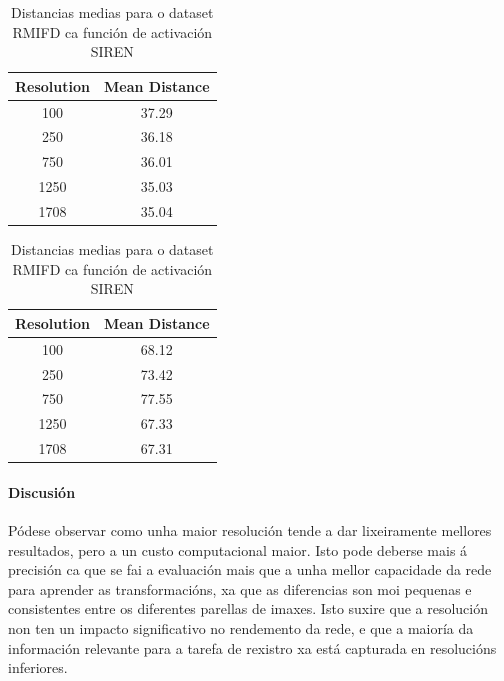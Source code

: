 \begin{table}[h]
    \centering
    \begin{minipage}[t]{0.45\linewidth}
        \centering
        \begin{tabular}{|c|c|}
        \hline
        Resolution & Mean Distance \\ \hline
        100 & 37.29 \\ \hline
        250 & 36.18 \\ \hline
        750 & 36.01 \\ \hline
        1250 & 35.03 \\ \hline
        1708 & 35.04 \\ \hline
        \end{tabular}
        \caption{Distancias medias para o dataset RFMID ca función de activación Relu}
        \label{tab:mlp_mean_distances_rfmid}
    \end{minipage}
    \hfill
    \begin{minipage}[t]{0.45\linewidth}
        \centering
        \begin{tabular}{|c|c|}
        \hline
        Resolution & Mean Distance \\ \hline
        100 & 68.12 \\ \hline
        250 & 73.42 \\ \hline
        750 & 77.55 \\ \hline
        1250 & 67.33 \\ \hline
        1708 & 67.31 \\ \hline
        \end{tabular}
        \caption{Distancias medias para o dataset RMIFD ca función de activación SIREN}
        \label{tab:siren_mean_distances_rfmid}
    \end{minipage}
\end{table}

\paragraph{Discusión}
\label{par:Discusión}

Pódese observar como unha maior resolución tende a dar lixeiramente mellores resultados, pero a un custo computacional maior.
Isto pode deberse mais á precisión ca que se fai a evaluación mais que a unha mellor capacidade da rede para aprender as transformacións, xa que as diferencias son moi pequenas e consistentes entre os diferentes parellas de imaxes.
Isto suxire que a resolución non ten un impacto significativo no rendemento da rede, e que a maioría da información relevante para a tarefa de rexistro xa está capturada en resolucións inferiores.


